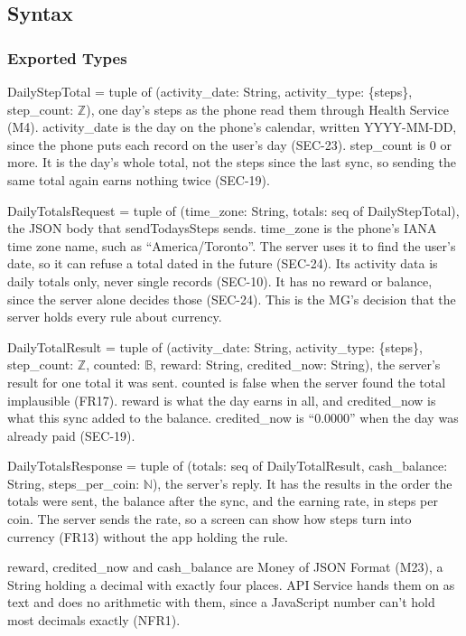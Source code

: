 \documentclass[12pt, titlepage]{article}
\begin{document}
\subsection{Syntax}

\subsubsection{Exported Types}

\noindent DailyStepTotal = tuple of (activity\_date: String, activity\_type:
\{steps\}, step\_count: $\mathbb{Z}$), one day's steps as the phone read them
through Health Service (M4). activity\_date is the day on the phone's calendar,
written YYYY-MM-DD, since the phone puts each record on the user's day
(SEC-23). step\_count is 0 or more. It is the day's whole total, not the steps
since the last sync, so sending the same total again earns nothing twice
(SEC-19).

\medskip
\noindent DailyTotalsRequest = tuple of (time\_zone: String, totals: seq of
DailyStepTotal), the JSON body that sendTodaysSteps sends. time\_zone is the
phone's IANA time zone name, such as ``America/Toronto''. The server uses it to
find the user's date, so it can refuse a total dated in the future (SEC-24).
Its activity data is daily totals only, never single records (SEC-10). It
has no reward or balance, since the server alone decides those (SEC-24).
This is the MG's decision that the server holds every rule about currency.

\medskip
\noindent DailyTotalResult = tuple of (activity\_date: String,
activity\_type: \{steps\}, step\_count: $\mathbb{Z}$, counted: $\mathbb{B}$,
reward: String, credited\_now: String), the server's result for one total it
was sent. counted is false when the server found the total implausible (FR17).
reward is what the day earns in all, and credited\_now is what this sync added
to the balance. credited\_now is ``0.0000'' when the day was already paid
(SEC-19).

\medskip
\noindent DailyTotalsResponse = tuple of (totals: seq of DailyTotalResult,
cash\_balance: String, steps\_per\_coin: $\mathbb{N}$), the server's reply. It
has the results in the order the totals were sent, the balance after the sync,
and the earning rate, in steps per coin. The server sends the rate, so a screen
can show how steps turn into currency (FR13) without the app holding the rule.

\medskip
\noindent reward, credited\_now and cash\_balance are Money of JSON Format
(M23), a String holding a decimal with exactly four places. API Service hands
them on as text and does no arithmetic with them, since a JavaScript number
can't hold most decimals exactly (NFR1).
\end{document}
